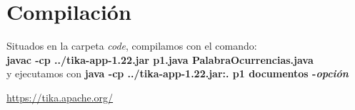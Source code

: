 \section{Compilación}
Situados en la carpeta \textit{code}, compilamos con el comando: \\
\textbf{javac -cp ../tika-app-1.22.jar p1.java PalabraOcurrencias.java} \\
y ejecutamos con \textbf{java -cp ../tika-app-1.22.jar:. p1 documentos -\textit{opción}}

\newpage
\begin{thebibliography}{9}
	\href{}{https://tika.apache.org/}
\end{thebibliography}

